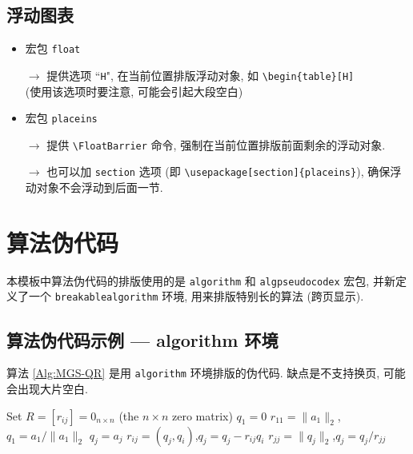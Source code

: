 \documentclass[openany]{MathematicalModelCaseStudyReport}  %
\numberwithin{algorithm}{chapter}
\begin{document}
\subsection{浮动图表}
\begin{itemize}
  \item 宏包 \Verb|float|

    $\to$ 提供选项 ``\Verb|H|", 在当前位置排版浮动对象, 如 \Verb|\begin{table}[H]| \\
    (使用该选项时要注意, 可能会引起大段空白)

\item 宏包 \Verb|placeins|

  $\to$ 提供 \Verb|\FloatBarrier| 命令, 强制在当前位置排版前面剩余的浮动对象.

  $\to$ 也可以加 \Verb|section| 选项 (即 \Verb|\usepackage[section]{placeins}|),
   确保浮动对象不会浮动到后面一节.


\end{itemize}

\clearpage
\section{算法伪代码}

本模板中算法伪代码的排版使用的是 \Verb|algorithm| 和 \Verb|algpseudocodex| 宏包,
并新定义了一个 \Verb|breakablealgorithm| 环境, 用来排版特别长的算法 (跨页显示).

\subsection{算法伪代码示例 --- algorithm 环境}

算法 \ref{Alg:MGS-QR} 是用 \Verb|algorithm| 环境排版的伪代码.
缺点是不支持换页, 可能会出现大片空白.

\begin{algorithm}[H]
\caption{基于 MGS 的 QR 分解\label{Alg:MGS-QR}}
\begin{algorithmic}[1]
  \Statex\hspace*{-2em}
  \State Set $R=[r_{ij}]=0_{n\times n}$  (the $n\times n$ zero matrix)
  \State $q_1=0$
  \Else
  \State $r_{11}=\|a_1\|_2$,\quad $q_1 = a_1/\|a_1\|_2$
  \EndIf
  \State $q_j = a_j$
   
  \State $r_{ij} = (q_j,q_i)$,\quad $q_j = q_j - r_{ij}q_i$
  \EndFor
  \State $r_{jj}=\|q_j\|_2$,\quad  $q_j = q_j/r_{jj}$
  \EndIf
  \EndFor
\end{algorithmic}
\end{algorithm}
\end{document}
